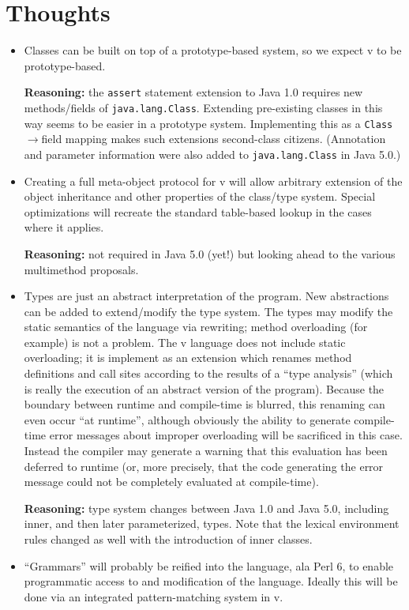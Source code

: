\documentclass[11pt,notitlepage,twocolumn]{article}
\newcommand{\vlang}{\textsf{v}\xspace}
\newcommand{\reasoning}{\par\textbf{Reasoning:}\xspace}
\begin{document}
\section{Thoughts}
\begin{itemize}
\item Classes can be built on top of a prototype-based system, so we
  expect \vlang to be prototype-based.  \reasoning the \texttt{assert}
  statement extension to Java 1.0 requires new methods/fields of
  \texttt{java.lang.Class}.  Extending pre-existing classes in this
  way seems to be easier in a prototype system. Implementing this as a
  \texttt{Class}$\to$field mapping makes such extensions second-class
  citizens.  (Annotation and parameter information were also added to
  \texttt{java.lang.Class} in Java 5.0.)
\item Creating a full meta-object protocol for \vlang will allow arbitrary
  extension of the object inheritance and other properties of the
  class/type system.  Special optimizations will recreate the standard
  table-based lookup in the cases where it applies.  \reasoning not required in
  Java 5.0 (yet!) but looking ahead to the various multimethod proposals.
\item Types are just an abstract interpretation of the program.  New
  abstractions can be added to extend/modify the type system.  The
  types may modify the static semantics of the language via rewriting;
  method overloading (for example) is not a problem.  The \vlang language
  does not include static overloading; it is implement as an extension which
  renames method definitions and call sites according to the results
  of a ``type analysis'' (which is really the execution of an abstract
  version of the program).  Because the boundary between runtime and
  compile-time is blurred, this renaming can even occur ``at
  runtime'', although obviously the ability to generate compile-time
  error messages about improper overloading will be sacrificed in this
  case.  Instead the compiler may generate a warning that this
  evaluation has been deferred to runtime (or, more precisely, that
  the code generating the error message could not be completely
  evaluated at compile-time).  \reasoning type system changes between
  Java 1.0 and Java 5.0, including inner, and then later
  parameterized, types.  Note that the lexical environment rules
  changed as well with the introduction of inner classes.
\item ``Grammars'' will probably be reified into the language, ala
  Perl 6, to enable programmatic access to and modification of the
  language.  Ideally this will be done via an integrated
  pattern-matching system in \vlang.


\end{itemize}
\end{document}
